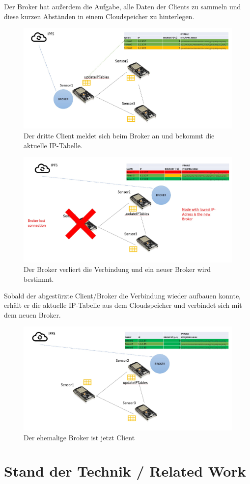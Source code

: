 \documentclass{article}
\begin{document}
Der Broker hat außerdem die Aufgabe, alle Daten der Clients zu sammeln und diese kurzen Abständen in einem Cloudspeicher zu hinterlegen. 
\begin{figure}[h]
    \centering
    \includegraphics[width=1\linewidth]{Porposal/Bild3.jpg}
    \caption{Der dritte Client meldet sich beim Broker an und bekommt die aktuelle IP-Tabelle.}
    \label{fig:statemachine}
\end{figure}
\begin{figure}[h]
    \centering
    \includegraphics[width=1\linewidth]{Porposal/Bild4.jpg}
    \caption{Der Broker verliert die Verbindung und ein neuer Broker wird bestimmt. }
    \label{fig:statemachine}
\end{figure}

Sobald der abgestürzte Client/Broker die Verbindung wieder aufbauen konnte, erhält er die aktuelle IP-Tabelle aus dem Cloudspeicher und verbindet sich mit dem neuen Broker.

\begin{figure}[h]
    \centering
    \includegraphics[width=1\linewidth]{Porposal/Bild5.jpg}
    \caption{Der ehemalige Broker ist jetzt Client}
    \label{fig:statemachine}
\end{figure}

\section{Stand der Technik / Related Work}
\end{document}
